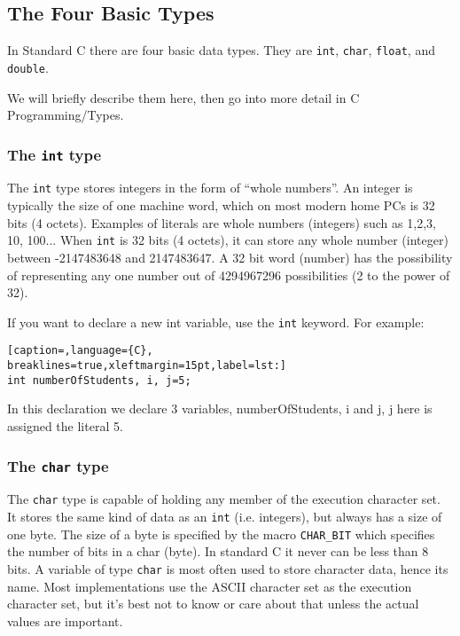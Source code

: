 \subsection{The Four Basic Types}
In Standard C there are four basic data types. They are \texttt{int},
\texttt{char}, \texttt{float}, and \texttt{double}.

We will briefly describe them here, then go into more detail in C
Programming/Types.

\subsubsection{The \texttt{int} type}
The \texttt{int} type stores integers in the form of ``whole numbers''. An
integer is typically the size of one machine word, which on most modern home
PCs is 32 bits (4 octets). Examples of literals are whole numbers (integers)
such as 1,2,3, 10, 100... When \texttt{int} is 32 bits (4 octets), it can store
any whole number (integer) between -2147483648 and 2147483647. A 32 bit word
(number) has the possibility of representing any one number out of 4294967296
possibilities (2 to the power of 32).

If you want to declare a new int variable, use the \texttt{int} keyword. For
example:

\lstset{basicstyle=\scriptsize, numbers=left, captionpos=b, tabsize=4}
\begin{lstlisting}[caption=,language={C},
breaklines=true,xleftmargin=15pt,label=lst:]
int numberOfStudents, i, j=5;
\end{lstlisting}

In this declaration we declare 3 variables, numberOfStudents, i and j, j here
is assigned the literal 5.

\subsubsection{The \texttt{char} type}
The \texttt{char} type is capable of holding any member of the execution
character set. It stores the same kind of data as an \texttt{int} (i.e.
integers), but always has a size of one byte. The size of a byte is specified
by the macro \texttt{CHAR\_BIT} which specifies the number of bits in a char
(byte). In standard C it never can be less than 8 bits. A variable of type
\texttt{char} is most often used to store character data, hence its name. Most
implementations use the ASCII character set as the execution character set, but
it's best not to know or care about that unless the actual values are
important.

